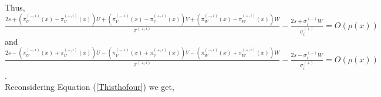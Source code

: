 \documentclass[12pt]{article}
\theoremstyle{Theorem}
\begin{document}
Thus, $\frac{2s + \left( \pi^{\scriptscriptstyle(-, i)}_{U}(x)- \pi^{\scriptscriptstyle(+, i)}_{U}(x)\right) U + \left(\pi^{\scriptscriptstyle(-, i)}_{V}(x)- \pi^{\scriptscriptstyle(+, i)}_{V}(x)\right)V + \left(\pi^{\scriptscriptstyle(-, i)}_{W}(x) - \pi^{\scriptscriptstyle(+, i)}_{W}(x)\right) W}{\pi^{\scriptscriptstyle(+, i)}} - \frac{2s + \sigma^{\scriptscriptstyle (-)}_{i}W}{\sigma^{\scriptscriptstyle (+)}_{i}} = O(\rho(x))$ and $ \frac{2s - \left( \pi^{\scriptscriptstyle(-, i)}_{U}(x)+\pi^{\scriptscriptstyle(+, i)}_{U}(x)\right) U - \left(\pi^{\scriptscriptstyle(-, i)}_{V}(x)+\pi^{\scriptscriptstyle(+, i)}_{V}(x)\right)V - \left(\pi^{\scriptscriptstyle(-, i)}_{W}(x) +\pi^{\scriptscriptstyle(+, i)}_{W}(x)\right) W}{\pi^{\scriptscriptstyle(+, i)}} - \frac{2s - \sigma^{\scriptscriptstyle (-)}_{i}W}{\sigma^{\scriptscriptstyle (+)}_{i}} = O(\rho(x))$.\\
Reconsidering Equation (\ref{Thisthofour}) we get,
\end{document}

